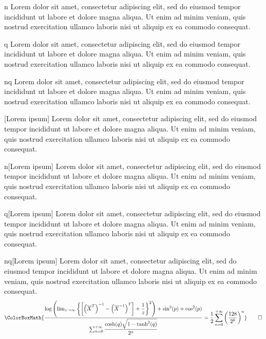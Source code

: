 \begin{corollary}{n}
	Lorem dolor sit amet, consectetur adipiscing elit, sed do eiusmod tempor incididunt ut labore et dolore magna aliqua. Ut enim ad minim veniam, quis nostrud exercitation ullamco laboris nisi ut aliquip ex ea commodo consequat.
\end{corollary}

\begin{corollary}{q}
	Lorem dolor sit amet, consectetur adipiscing elit, sed do eiusmod tempor incididunt ut labore et dolore magna aliqua. Ut enim ad minim veniam, quis nostrud exercitation ullamco laboris nisi ut aliquip ex ea commodo consequat.
\end{corollary}

\begin{corollary}{nq}
	Lorem dolor sit amet, consectetur adipiscing elit, sed do eiusmod tempor incididunt ut labore et dolore magna aliqua. Ut enim ad minim veniam, quis nostrud exercitation ullamco laboris nisi ut aliquip ex ea commodo consequat.
\end{corollary}

\begin{corollary}{}[Lorem ipsum]
	Lorem dolor sit amet, consectetur adipiscing elit, sed do eiusmod tempor incididunt ut labore et dolore magna aliqua. Ut enim ad minim veniam, quis nostrud exercitation ullamco laboris nisi ut aliquip ex ea commodo consequat.
\end{corollary}

\begin{corollary}{n}[Lorem ipsum]
	Lorem dolor sit amet, consectetur adipiscing elit, sed do eiusmod tempor incididunt ut labore et dolore magna aliqua. Ut enim ad minim veniam, quis nostrud exercitation ullamco laboris nisi ut aliquip ex ea commodo consequat.
\end{corollary}

\begin{corollary}{q}[Lorem ipsum]
	Lorem dolor sit amet, consectetur adipiscing elit, sed do eiusmod tempor incididunt ut labore et dolore magna aliqua. Ut enim ad minim veniam, quis nostrud exercitation ullamco laboris nisi ut aliquip ex ea commodo consequat.
\end{corollary}

\begin{corollary}{nq}[Lorem ipsum]
	Lorem dolor sit amet, consectetur adipiscing elit, sed do eiusmod tempor incididunt ut labore et dolore magna aliqua. Ut enim ad minim veniam, quis nostrud exercitation ullamco laboris nisi ut aliquip ex ea commodo consequat.
	\begin{equation*}
		\ColorBoxMath{\dfrac{\log\left(\lim_{z\to\infty}\left\{\left[\left(\overline{X}^{T}\right)^{-1}-\left(\overline{X}^{-1}\right)^T\right]+\dfrac{1}{z}\right\}^2\right)+\sin^2(p)+\cos^2(p)}{\sum_{n=0}^{+\infty}\dfrac{\cosh(q)\sqrt{1-\tanh^2(q)}}{2^n}}=\dfrac{1}{2}\sum_{n=0}^{+\infty}\left(\dfrac{128}{2^8}\right)^n}\qedhere
	\end{equation*}
\end{corollary}


